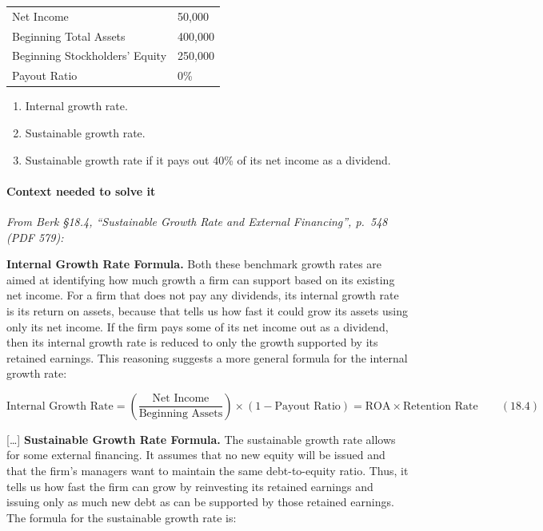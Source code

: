 \documentclass[11pt,a4paper]{article}
\begin{document}
{\def\LTcaptype{none} %
\begin{longtable}[]{@{}ll@{}}
\toprule\noalign{}
\endhead
\bottomrule\noalign{}
\endlastfoot
Net Income & 50,000 \\
Beginning Total Assets & 400,000 \\
Beginning Stockholders' Equity & 250,000 \\
Payout Ratio & 0\% \\
\end{longtable}
}

\begin{enumerate}
\def\labelenumi{\alph{enumi}.}
\item
  Internal growth rate.
\item
  Sustainable growth rate.
\item
  Sustainable growth rate if it pays out 40\% of its net income as a dividend.
\end{enumerate}

\paragraph{Context needed to solve it}

\emph{From Berk §18.4, ``Sustainable Growth Rate and External Financing'', p.~548 (PDF 579):}

\textbf{Internal Growth Rate Formula.} Both these benchmark growth rates are aimed at identifying
how much growth a firm can support based on its existing net income. For a firm that does not pay
any dividends, its internal growth rate is its return on assets, because that tells us how fast it
could grow its assets using only its net income. If the firm pays some of its net income out as a
dividend, then its internal growth rate is reduced to only the growth supported by its retained
earnings. This reasoning suggests a more general formula for the internal growth rate:

\[\text{Internal Growth Rate} = \left(\frac{\text{Net Income}}{\text{Beginning Assets}}\right) \times (1 - \text{Payout Ratio}) = \text{ROA} \times \text{Retention Rate} \qquad (18.4)\]

{[}\ldots{]} \textbf{Sustainable Growth Rate Formula.} The sustainable growth rate allows for some
external financing. It assumes that no new equity will be issued and that the firm's managers want
to maintain the same debt-to-equity ratio. Thus, it tells us how fast the firm can grow by
reinvesting its retained earnings and issuing only as much new debt as can be supported by those
retained earnings. The formula for the sustainable growth rate is:
\end{document}
